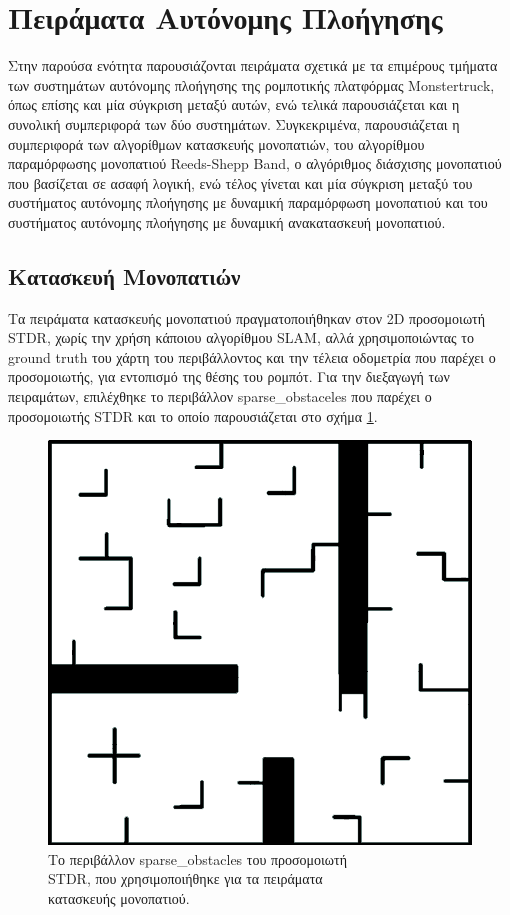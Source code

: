\FloatBarrier


\newpage
\section{Πειράματα Αυτόνομης Πλοήγησης} \label{sec:navigation_experiments}
Στην παρούσα ενότητα παρουσιάζονται πειράματα σχετικά με τα επιμέρους τμήματα των συστημάτων αυτόνομης πλοήγησης της ρομποτικής πλατφόρμας Monstertruck, όπως επίσης και μία σύγκριση μεταξύ αυτών, ενώ τελικά παρουσιάζεται και η συνολική συμπεριφορά των δύο συστημάτων. Συγκεκριμένα, παρουσιάζεται η συμπεριφορά των αλγορίθμων κατασκευής μονοπατιών, του αλγορίθμου παραμόρφωσης μονοπατιού Reeds-Shepp Band, ο αλγόριθμος διάσχισης μονοπατιού που βασίζεται σε ασαφή λογική, ενώ τέλος γίνεται και μία σύγκριση μεταξύ του συστήματος αυτόνομης πλοήγησης με δυναμική παραμόρφωση μονοπατιού και του συστήματος αυτόνομης πλοήγησης με δυναμική ανακατασκευή μονοπατιού.

\subsection{Κατασκευή Μονοπατιών} \label{ssec:path_planning_experiments}
Τα πειράματα κατασκευής μονοπατιού πραγματοποιήθηκαν στον 2D προσομοιωτή STDR, χωρίς την χρήση κάποιου αλγορίθμου SLAM, αλλά χρησιμοποιώντας το ground truth του χάρτη του περιβάλλοντος και την τέλεια οδομετρία που παρέχει ο προσομοιωτής, για εντοπισμό της θέσης του ρομπότ. Για την διεξαγωγή των πειραμάτων, επιλέχθηκε το περιβάλλον sparse{\_}obstaceles που παρέχει ο προσομοιωτής STDR και το οποίο παρουσιάζεται στο σχήμα \ref{fig:sparse_obstacles}.

\begin{figure}[!ht]
	\centering
	\includegraphics[width=0.4\linewidth]{Chapters/Chapter5/Figures/sparse_obstacles.png}
	\caption{Το περιβάλλον sparse{\_}obstacles του προσομοιωτή\\ STDR, που χρησιμοποιήθηκε για τα πειράματα\\κατασκευής μονοπατιού.}
	\label{fig:sparse_obstacles}
\end{figure}

